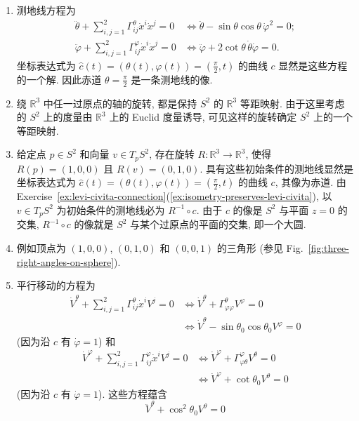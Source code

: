 \begin{description}[font=\normalfont,leftmargin=2em,labelwidth=1.5em]
\begin{enumerate}[label=(\alph*),ref=\alph*,leftmargin=*]
\[
  \Gamma^\varphi_{\theta\varphi}=\Gamma^\varphi_{\varphi\theta}=\cot\theta.
\]
\item 测地线方程为
\begin{align*}
  \ddot\theta+\sum_{i,j=1}^2\Gamma^\theta_{ij}\dot{x}^i\dot{x}^j=0
  &\iff \ddot\theta-\sin\theta\cos\theta\,\dot\varphi^2=0;\\
  \ddot\varphi+\sum_{i,j=1}^2\Gamma^\varphi_{ij}\dot{x}^i\dot{x}^j=0
  &\iff\ddot\varphi+2\cot\theta\,\dot\theta\dot\varphi=0.
\end{align*}
坐标表达式为 $\widehat c(t)=(\theta(t),\varphi(t))=(\frac{\pi}{2},t)$ 的曲线 $c$ 显然是这些方程的一个解. 因此赤道 $\theta=\frac{\pi}{2}$ 是一条测地线的像.
\item 绕 $\mathbb{R}^3$ 中任一过原点的轴的旋转, 都是保持 $S^2$ 的 $\mathbb{R}^3$ 等距映射. 由于这里考虑的 $S^2$ 上的度量由 $\mathbb{R}^3$ 上的 Euclid 度量诱导, 可见这样的旋转确定 $S^2$ 上的一个等距映射.
\item 给定点 $p\in S^2$ 和向量 $v\in T_pS^2$, 存在旋转 $R:\mathbb{R}^3\to\mathbb{R}^3$, 使得 $R(p)=(1,0,0)$ 且 $R(v)=(0,1,0)$. 具有这些初始条件的测地线显然是坐标表达式为 $\widehat c(t)=(\theta(t),\varphi(t))=(\frac{\pi}{2},t)$ 的曲线 $c$, 其像为赤道. 由 Exercise~\ref{ex:levi-civita-connection}(\ref{ex:isometry-preserves-levi-civita}), 以 $v\in T_pS^2$ 为初始条件的测地线必为 $R^{-1}\circ c$. 由于 $c$ 的像是 $S^2$ 与平面 $z=0$ 的交集, $R^{-1}\circ c$ 的像就是 $S^2$ 与某个过原点的平面的交集, 即一个大圆.
\item 例如顶点为 $(1,0,0)$, $(0,1,0)$ 和 $(0,0,1)$ 的三角形 (参见 Fig.~\ref{fig:three-right-angles-on-sphere}).
\item\label{sol:parallel-transport-along-a-latitude} 平行移动的方程为
\begin{align*}
  \dot V^\theta+\sum_{i,j=1}^2\Gamma^\theta_{ij}\dot{x}^iV^j=0
  &\iff\dot V^\theta+\Gamma^\theta_{\varphi\varphi}V^\varphi=0\\
  &\iff\dot V^\theta-\sin\theta_0\cos\theta_0V^\varphi=0
\end{align*}
(因为沿 $c$ 有 $\dot\varphi=1$) 和
\begin{align*}
  \dot V^\varphi+\sum_{i,j=1}^2\Gamma^\varphi_{ij}\dot{x}^iV^j=0
  &\iff\dot V^\varphi+\Gamma^\varphi_{\varphi\theta}V^\theta=0\\
  &\iff\dot V^\varphi+\cot\theta_0V^\theta=0
\end{align*}
(因为沿 $c$ 有 $\dot\varphi=1$). 这些方程蕴含
\[
  \ddot V^\theta+\cos^2\theta_0V^\theta=0
\]
\end{enumerate}
\end{description}
